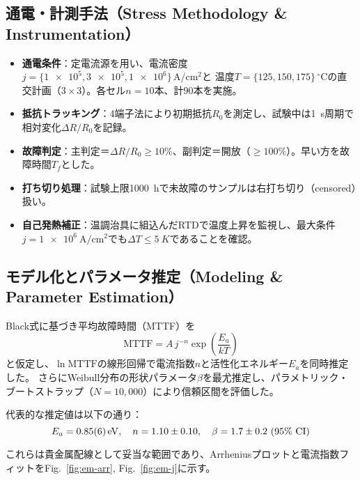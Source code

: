 \documentclass[conference]{IEEEtran}
\begin{document}
\subsection{通電・計測手法（Stress Methodology \& Instrumentation）}
\begin{itemize}
  \item \textbf{通電条件}：定電流源を用い、電流密度$j=\{ \SI{1e5}, \SI{3e5}, \SI{1e6}\}\,\si{\ampere\per\centi\meter\squared}$と
        温度$T=\{ \SI{125}, \SI{150}, \SI{175}\}\,^\circ\mathrm{C}$の直交計画（$3\times 3$）。各セル$n=10$本、計90本を実施。
  \item \textbf{抵抗トラッキング}：4端子法により初期抵抗$R_0$を測定し、試験中は\SI{1}{s}周期で相対変化$\Delta R/R_0$を記録。
  \item \textbf{故障判定}：主判定＝$\Delta R/R_0 \ge 10\%$、副判定＝開放（$\ge 100\%$）。早い方を故障時間$T_f$とした。
  \item \textbf{打ち切り処理}：試験上限\SI{1000}{h}で未故障のサンプルは右打ち切り（censored）扱い。
  \item \textbf{自己発熱補正}：温調治具に組込んだRTDで温度上昇を監視し、最大条件$j=\SI{1e6}{\ampere\per\centi\meter\squared}$でも$\Delta T \le \SI{5}{K}$であることを確認。
\end{itemize}

\subsection{モデル化とパラメータ推定（Modeling \& Parameter Estimation）}
Black式\cite{Black}に基づき平均故障時間（MTTF）を
\begin{equation}
  \mathrm{MTTF} = A \, j^{-n}\exp\!\left(\frac{E_a}{kT}\right)
  \label{eq:black}
\end{equation}
と仮定し、$\ln \mathrm{MTTF}$の線形回帰で電流指数$n$と活性化エネルギー$E_a$を同時推定した。
さらにWeibull分布の形状パラメータ$\beta$を最尤推定し、パラメトリック・ブートストラップ（$N=10{,}000$）により信頼区間を評価した。

代表的な推定値は以下の通り：
\[
  E_a = \SI{0.85 \pm 0.06}{eV}, \quad
  n = 1.10 \pm 0.10, \quad
  \beta = 1.7 \pm 0.2 \ (95\% \ \mathrm{CI})
\]

これらは貴金属配線として妥当な範囲であり、Arrheniusプロットと電流指数フィットをFig.~\ref{fig:em-arr}, Fig.~\ref{fig:em-j}に示す。
\end{document}
